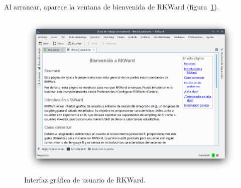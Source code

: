 Al arrancar, aparece la ventana de bienvenida de RKWard (figura~\ref{g:rkward}).
\begin{figure}[htp]
  \centering
  \includegraphics[scale=0.5]{capitulos/introduccion/img/rkward-bienvenida}
  \caption{Interfaz gráfica de usuario de RKWard.}
  \label{g:rkward}
\end{figure}

